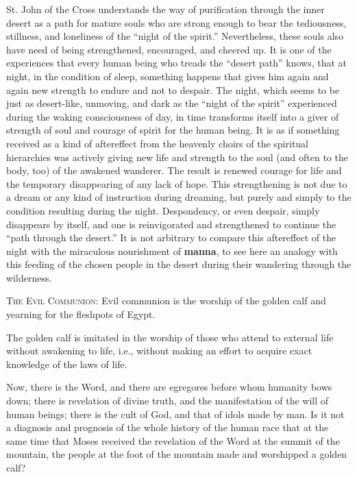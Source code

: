 \begin{quotex}
St. John of the Cross understands the way of purification through the inner desert as a path for mature souls who are strong enough to bear the tediousness, stillness, and loneliness of the ``night of the spirit.'' Nevertheless, these souls also have need of being strengthened, encouraged, and cheered up. It is one of the experiences that every human being who treads the ``desert path'' knows, that at night, in the condition of sleep, something happens that gives him again and again new strength to endure and not to despair. The night, which seems to be just as desert-like, unmoving, and dark as the ``night of the spirit'' experienced during the waking consciousness of day, in time transforms itself into a giver of strength of soul and courage of spirit for the human being. It is as if something received as a kind of aftereffect from the heavenly choirs of the spiritual hierarchies was actively giving new life and strength to the soul (and often to the body, too) of the awakened wanderer. The result is renewed courage for life and the temporary disappearing of any lack of hope. This strengthening is not due to a dream or any kind of instruction during dreaming, but purely and simply to the condition resulting during the night. Despondency, or even despair, simply disappears by itself, and one is reinvigorated and strengthened to continue the ``path through the desert.'' It is not arbitrary to compare this aftereffect of the night with the miraculous nourishment of \textbf{manna}, to see here an analogy with this feeding of the chosen people in the desert during their wandering through the wilderness. 

\end{quotex}

\textsc{The Evil Communion}:
Evil communion is the worship of the golden calf and yearning for the fleshpots of Egypt.

The golden calf is imitated in the worship of those who attend to external life without awakening to life, i.e., without making an effort to acquire exact knowledge of the laws of life.

Now, there is the Word, and there are egregores before whom humanity bows down; there is revelation of divine truth, and the manifestation of the will of human beings; there is the cult of God, and that of idols made by man. Is it not a diagnosis and prognosis of the whole history of the human race that at the same time that Moses received the revelation of the Word at the summit of the mountain, the people at the foot of the mountain made and worshipped a golden calf?

